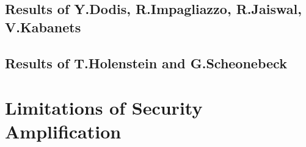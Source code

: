 \documentclass[11pt,a4paper,titlepage]{memoir}
\begin{document}
\subsection{Results of Y.Dodis, R.Impagliazzo, R.Jaiswal, V.Kabanets}
\subsection{Results of T.Holenstein and G.Scheonebeck}
\section{Limitations of Security Amplification}



\appendix


\backmatter



\end{document}
